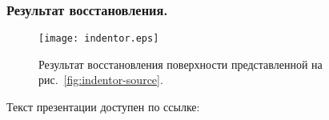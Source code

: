 \documentclass{beamer}
\begin{document}
\begin{frame}
    \frametitle{Результат восстановления.}
    \begin{figure}
        \texttt{[image: indentor.eps]}
        \caption{Результат восстановления поверхности представленной на рис.~\ref{fig:indentor-source}.}
        {\label{fig:indentor}}%
    \end{figure}
\end{frame}

\begin{frame}
    Текст презентации доступен по ссылке:

\end{frame}


\begin{frame}[allowframebreaks]
    
\end{frame}
\end{document}
